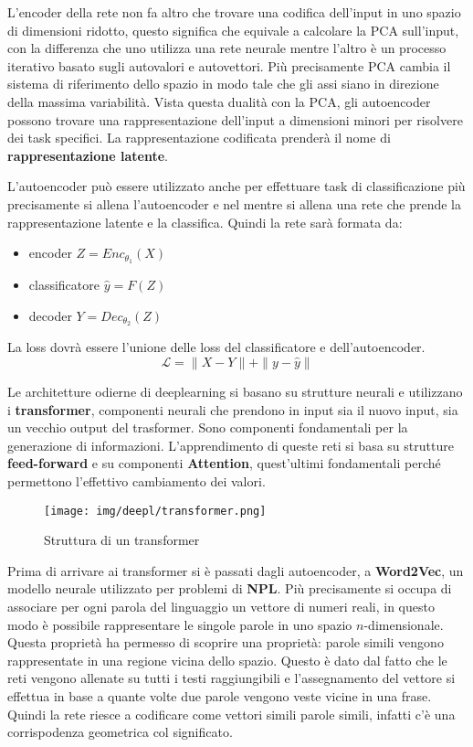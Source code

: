 L'encoder della rete non fa altro che trovare una codifica dell'input in uno spazio
di dimensioni ridotto, questo significa che equivale a calcolare la PCA sull'input,
con la differenza che uno utilizza una rete neurale mentre l'altro è un processo 
iterativo basato sugli autovalori e autovettori. Più precisamente PCA cambia il
sistema di riferimento dello spazio in modo tale che gli assi siano in direzione
della massima variabilità. Vista questa dualità con la PCA, gli autoencoder possono 
trovare una rappresentazione dell'input a dimensioni minori per risolvere dei task
specifici. La rappresentazione codificata prenderà il nome di \textbf{rappresentazione
latente}.

L'autoencoder può essere utilizzato anche per effettuare task di classificazione
più precisamente si allena l'autoencoder e nel mentre si allena una rete che prende
la rappresentazione latente e la classifica. Quindi la rete sarà formata da:
\begin{itemize}
      \item encoder $Z = Enc_{\theta_1}(X)$
      \item classificatore $ \hat{y} = F(Z)$
      \item decoder $Y = Dec_{\theta_2}(Z)$
\end{itemize}
La loss dovrà essere l'unione delle loss del classificatore e dell'autoencoder.
\begin{equation}
      \mathcal{L} = \| X - Y \| + \| y - \hat{y} \| 
\end{equation}

Le architetture odierne di deeplearning si basano su strutture neurali e utilizzano i
\textbf{transformer}, componenti neurali che prendono in input sia il nuovo input,
sia un vecchio output del trasformer. Sono componenti fondamentali per la generazione
di informazioni. L'apprendimento di queste reti si basa su strutture \textbf{feed-forward}
e su componenti \textbf{Attention}, quest'ultimi fondamentali perché permettono
l'effettivo cambiamento dei valori.
\begin{figure}[!ht]
    \centering
    \texttt{[image: img/deepl/transformer.png]}
    \caption{Struttura di un transformer}
    \label{fig:transformer}
\end{figure}
Prima di arrivare ai transformer si è passati dagli autoencoder, a \textbf{Word2Vec},
un modello neurale utilizzato per problemi di \textbf{NPL}. Più precisamente si occupa
di associare per ogni parola del linguaggio un vettore di numeri reali, in questo
modo è possibile rappresentare le singole parole in uno spazio $n$-dimensionale.
Questa proprietà ha permesso di scoprire una proprietà: parole simili vengono
rappresentate in una regione vicina dello spazio. Questo è dato dal fatto che
le reti vengono allenate su tutti i testi raggiungibili e l'assegnamento del vettore
si effettua in base a quante volte due parole vengono veste vicine in una frase.
Quindi la rete riesce a codificare come vettori simili parole simili, infatti c'è
una corrispodenza geometrica col significato.

